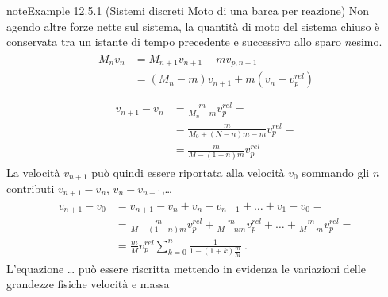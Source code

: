 \documentclass[letterpaper,10pt,italian]{jupyterBook}
\begin{document}
\begin{sphinxadmonition}{note}{Example 12.5.1 (Sistemi discreti \sphinxhyphen{} Moto di una barca per reazione)}
\sphinxAtStartPar
Non agendo altre forze nette sul sistema, la quantità di moto del sistema chiuso è conservata tra un istante di tempo precedente e successivo allo sparo \(n\)\sphinxhyphen{}esimo.
\begin{equation*}
\begin{split}\begin{aligned}
  M_{n} v_{n} 
  & = M_{n+1} v_{n+1} + m v_{p,n+1} \\
  & = ( M_{n} - m ) v_{n+1} + m ( v_{n} + v_p^{rel} ) \\
\end{aligned}\end{split}
\end{equation*}\begin{equation*}
\begin{split}\begin{aligned}
  v_{n+1} - v_n & = \frac{m}{M_n - m} v_p^{rel} = \\
  & = \frac{m}{M_0 + (N-n)m - m} v_p^{rel} = \\
  & = \frac{m}{M - (1+n) m} v_p^{rel}
\end{aligned}\end{split}
\end{equation*}
\sphinxAtStartPar
La velocità \(v_{n+1}\) può quindi essere riportata alla velocità \(v_0\) sommando gli \(n\) contributi \(v_{n+1} - v_{n}\), \(v_{n} - v_{n-1}\),…
\begin{equation*}
\begin{split}\begin{aligned}
  v_{n+1} - v_0 & = v_{n+1} - v_n + v_n - v_{n-1} + \dots + v_1 - v_0 = \\
  & = \frac{m}{M - (1+n) m} v_p^{rel} +  \frac{m}{M - n m} v_p^{rel} + \dots + \frac{m}{M-m} v^{rel}_p = \\
  & = \frac{m}{M} v_p^{rel} \sum_{k = 0}^{n} \frac{1}{1 - (1+k) \frac{m}{M}} \ .
\end{aligned}\end{split}
\end{equation*}
\sphinxAtStartPar
{} L’equazione … può essere riscritta mettendo in evidenza le variazioni delle grandezze fisiche velocità e massa


\end{sphinxadmonition}
\end{document}
